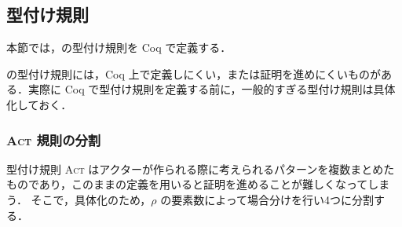 







\subsection{型付け規則}

本節では，\api の型付け規則を Coq で定義する．

\api の型付け規則には，Coq 上で定義しにくい，または証明を進めにくいものがある．実際に Coq で型付け規則を定義する前に，一般的すぎる型付け規則は具体化しておく．

\subsubsection{\textsc{Act} 規則の分割}

型付け規則 \textsc{Act} はアクターが作られる際に考えられるパターンを複数まとめたものであり，このままの定義を用いると証明を進めることが難しくなってしまう．
そこで，具体化のため，$\rho$ の要素数によって場合分けを行い4つに分割する．









